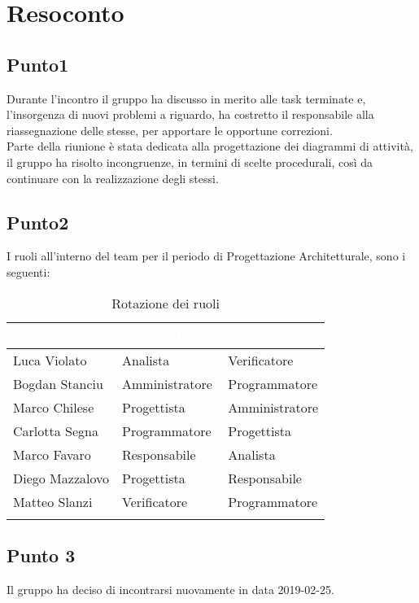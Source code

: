 \section{Resoconto}

\subsection{Punto1} 
Durante l'incontro il gruppo ha discusso in merito alle task terminate e, l'insorgenza di nuovi problemi a riguardo, ha costretto il responsabile alla riassegnazione delle stesse, per apportare le opportune correzioni. \-\\
Parte della riunione è stata dedicata alla progettazione dei diagrammi di attività, il gruppo ha risolto incongruenze, in termini di scelte procedurali, così da continuare con la realizzazione degli stessi.


\subsection{Punto2}
I ruoli all'interno del team per il periodo di Progettazione Architetturale, sono i seguenti:

\begin{center}
\begin{longtable}[c]{|m{}|m{}|m{}|} 
\hline
\rowcolor{bluelogo}\textbf{\textcolor{white}{Membro}} & \textbf{\textcolor{white}{Vecchio Ruolo}} & \textbf{\textcolor{white}{Nuovo Ruolo}}\\
\hline
\hline
Luca Violato & Analista & Verificatore\\
\hline
\rowcolor{grigio}Bogdan Stanciu & Amministratore & Programmatore\\
\hline
Marco Chilese & Progettista & Amministratore\\
\hline
\rowcolor{grigio}Carlotta Segna & Programmatore & Progettista\\
\hline
Marco Favaro & Responsabile & Analista\\
\hline
\rowcolor{grigio} Diego Mazzalovo & Progettista & Responsabile\\
\hline
Matteo Slanzi & Verificatore & Programmatore\\
\hline
\caption{Rotazione dei ruoli}
\end{longtable}
\end{center}

\subsection{Punto 3}
Il gruppo ha deciso di incontrarsi nuovamente in data 2019-02-25.
